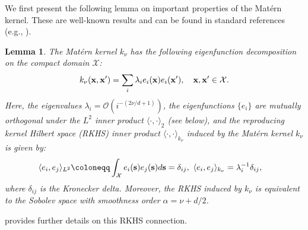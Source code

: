 \documentclass[aos,preprint]{imsart}
\theoremstyle{plain}
\newtheorem{lemma}[theorem]{Lemma}
\newcommand{\CalO}{\mathcal O}
\newcommand{\CalX}{\mathcal X}
\newcommand{\Bx}{\bold x}
\newcommand{\Bs}{\bold s}
\newcommand{\BFx}{\bold x}
\theoremstyle{remark}
\begin{document}
\begin{appendix}
We first present the  following lemma on important properties of the Mat\'ern kernel. These are well-known results and can be found in standard references (e.g., \cite[Sec 1.2.1]{yang2022graph}). 
\begin{lemma}
    \label{lem:eigen_mat}
    The Mat\'ern kernel $k_\nu$ has the following eigenfunction decomposition on the compact domain $\CalX$:
    \begin{equation}
        \label{eq:eign_mat}
        k_\nu(\BFx,\BFx')=\sum_i\lambda_ie_i(\BFx)e_i(\BFx'),\quad \Bx,\Bx'\in\CalX.
    \end{equation}
    Here, the eigenvalues $\lambda_i=\CalO(i^{-(2\nu/d+1)})$, the eigenfunctions $\{e_i\}$ are mutually orthogonal under the $L^2$ inner product $\langle\cdot,\cdot\rangle_2$ (see below), and the reproducing kernel Hilbert space (RKHS) inner product $\langle\cdot,\cdot\rangle_{k_\nu}$ induced by the Mat\'ern kernel $k_\nu$ is given by:
    \begin{align*}
        &\langle e_i,e_j\rangle_{L^2}\coloneqq\int_\CalX e_i(\Bs)e_j(\Bs)d\Bs=\delta_{ij},\ \langle e_i,e_j\rangle_{k_\nu}=\lambda_i^{-1}\delta_{ij},
    \end{align*}
   where $\delta_{ij}$ is the Kronecker delta. Moreover, the RKHS induced by $k_\nu$ is equivalent to the Sobolev space with smoothness order  $\alpha=\nu+d/2$.
\end{lemma}
\noindent \cite{Wendland10,paulsen2016introduction} provides further details on this RKHS connection.


\end{appendix}
\end{document}
